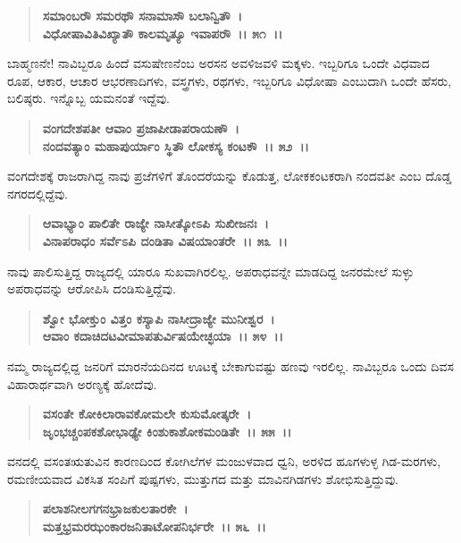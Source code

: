 \begin{verse}
\textbf{ಸಮಾಂಬರೌ ಸಮರಥೌ ಸನಾಮಾಸೌ ಬಲಾನ್ವಿತೌ~।}\\\textbf{ವಿಧೋಷಾವಿತಿವಿಖ್ಯಾತೌ ಕಾಲಮೃತ್ಯೂ ಇವಾಪರೌ‌~।। ೫೧~।। }
\end{verse}

ಬಾಹ್ಮಣನೇ! ನಾವಿಬ್ಬರೂ ಹಿಂದೆ ವಸುಷೇಣನೆಂಬ ಅರಸನ ಅವಳಿಜವಳಿ ಮಕ್ಕಳು. ಇಬ್ಬರಿಗೂ ಒಂದೇ ವಿಧವಾದ ರೂಪ, ಆಕಾರ, ಆಚಾರ ಆಭರಣಾದಿಗಳು, ವಸ್ತ್ರಗಳು, ರಥಗಳು, ಇಬ್ಬರಿಗೂ ವಿಧೋಷಾ ಎಂಬುದಾಗಿ ಒಂದೇ ಹೆಸರು, ಬಲಿಷ್ಠರು. ಇನ್ನೊಬ್ಬ ಯಮನಂತೆ ಇದ್ದೆವು.

\begin{verse}
\textbf{ವಂಗದೇಶಪತೀ ಆವಾಂ ಪ್ರಜಾಪೀಡಾಪರಾಯಣೌ~।}\\\textbf{ನಂದವತ್ಯಾಂ ಮಹಾಪುರ್ಯಾಂ ಸ್ಥಿತೌ ಲೋಕಸ್ಯ ಕಂಟಕೌ~।। ೫೨~।।} 
\end{verse}

ವಂಗದೇಶಕ್ಕೆ ರಾಜರಾಗಿದ್ದ ನಾವು ಪ್ರಜೆಗಳಿಗೆ ತೊಂದರೆಯನ್ನು ಕೊಡುತ್ತ, ಲೋಕಕಂಟಕರಾಗಿ ನಂದವತೀ ಎಂಬ ದೊಡ್ಡ ನಗರದಲ್ಲಿದ್ದೆವು.

\begin{verse}
\textbf{ಆವಾಭ್ಯಾಂ ಪಾಲಿತೇ ರಾಜ್ಯೇ ನಾಸೀತ್ಕೋಽಪಿ ಸುಖೀಜನಃ~।}\\\textbf{ವಿನಾಪರಾಧಂ ಸರ್ವೆಽಪಿ ದಂಡಿತಾ ವಿಷಯಾಂತರೇ~।। ೫೩~।। }
\end{verse}

ನಾವು ಪಾಲಿಸುತ್ತಿದ್ದ ರಾಜ್ಯದಲ್ಲಿ ಯಾರೂ ಸುಖವಾಗಿರಲಿಲ್ಲ. ಅಪರಾಧವನ್ನೇ ಮಾಡದಿದ್ದ ಜನರಮೇಲೆ ಸುಳ್ಳು ಅಪರಾಧವನ್ನು ಆರೋಪಿಸಿ ದಂಡಿಸುತ್ತಿದ್ದೆವು.

\begin{verse}
\textbf{ಶ್ವೋ ಭೋಕ್ತುಂ ವಿತ್ತಂ ಕಸ್ಯಾಪಿ ನಾಸೀದ್ರಾಜ್ಯೇ ಮುನೀಶ್ವರ~।}\\\textbf{ಆವಾಂ ಕದಾಚಿದಟವೀಮಾಪತುರ್ವಿಷಯೇಚ್ಛಯಾ~।। ೫೪~।। }
\end{verse}

ನಮ್ಮ ರಾಜ್ಯದಲ್ಲಿದ್ದ ಜನರಿಗೆ ಮಾರನೆಯದಿನದ ಊಟಕ್ಕೆ ಬೇಕಾಗುವಷ್ಟು ಹಣವು ಇರಲಿಲ್ಲ. ನಾವಿಬ್ಬರೂ ಒಂದು ದಿವಸ ವಿಹಾರಾರ್ಥವಾಗಿ ಅರಣ್ಯಕ್ಕೆ ಹೋದೆವು.

\begin{verse}
\textbf{ವಸಂತೇ ಕೋಕಿಲಾರಾವಕೋಮಲೇ ಕುಸುಮೋತ್ಕರೇ~।}\\\textbf{ಜೃಂಭಚ್ಚಂಪಕಶೋಭಾಢ್ಯೇ ಕಿಂಶುಕಾಶೋಕಮಂಡಿತೇ~।। ೫೫~।। }
\end{verse}

ವನದಲ್ಲಿ ವಸಂತಋತುವಿನ ಕಾರಣದಿಂದ ಕೋಗಿಲೆಗಳ ಮಂಜುಳವಾದ ಧ್ವನಿ, ಅರಳಿದ ಹೂಗಳುಳ್ಳ ಗಿಡ-ಮರಗಳು, ರಮಣೀಯವಾದ ವಿಕಸಿತ ಸಂಪಿಗೆ ಪುಷ್ಪಗಳು, ಮುತ್ತುಗದ ಮತ್ತು ಮಾವಿನಗಿಡಗಳು ಶೋಭಿಸುತ್ತಿದ್ದುವು.

\begin{verse}
\textbf{ಪಲಾಶನೀಲಗಗನಭ್ರಾಜಕುಲತಾರಕೇ~।}\\\textbf{ಮತ್ತಭ್ರಮರಝಂಕಾರಜನಿತಾಟೋಪನಿರ್ಭರೇ~।। ೫೬~।।} 
\end{verse}

